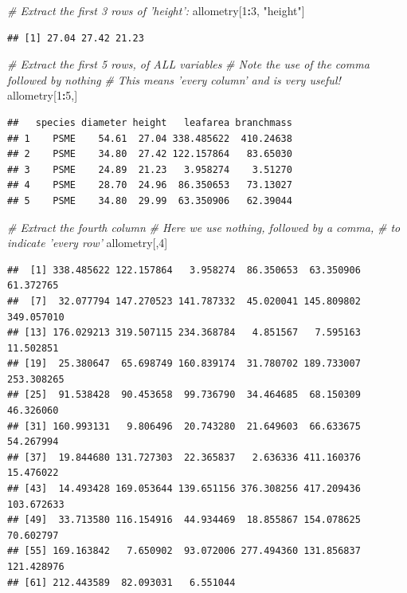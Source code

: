 \documentclass[]{book}
\newenvironment{Shaded}{\begin{snugshade}}{\end{snugshade}}
\newcommand{\CommentTok}[1]{\textcolor[rgb]{0.56,0.35,0.01}{\textit{#1}}}
\newcommand{\DecValTok}[1]{\textcolor[rgb]{0.00,0.00,0.81}{#1}}
\newcommand{\NormalTok}[1]{#1}
\newcommand{\OperatorTok}[1]{\textcolor[rgb]{0.81,0.36,0.00}{\textbf{#1}}}
\newcommand{\StringTok}[1]{\textcolor[rgb]{0.31,0.60,0.02}{#1}}
\begin{document}
\begin{Shaded}
\begin{Highlighting}[]
\CommentTok{# Extract the first 3 rows of 'height':}
\NormalTok{allometry[}\DecValTok{1}\OperatorTok{:}\DecValTok{3}\NormalTok{, }\StringTok{"height"}\NormalTok{]}
\end{Highlighting}
\end{Shaded}

\begin{verbatim}
## [1] 27.04 27.42 21.23
\end{verbatim}

\begin{Shaded}
\begin{Highlighting}[]
\CommentTok{# Extract the first 5 rows, of ALL variables}
\CommentTok{# Note the use of the comma followed by nothing}
\CommentTok{# This means 'every column' and is very useful!}
\NormalTok{allometry[}\DecValTok{1}\OperatorTok{:}\DecValTok{5}\NormalTok{,]}
\end{Highlighting}
\end{Shaded}

\begin{verbatim}
##   species diameter height   leafarea branchmass
## 1    PSME    54.61  27.04 338.485622  410.24638
## 2    PSME    34.80  27.42 122.157864   83.65030
## 3    PSME    24.89  21.23   3.958274    3.51270
## 4    PSME    28.70  24.96  86.350653   73.13027
## 5    PSME    34.80  29.99  63.350906   62.39044
\end{verbatim}

\begin{Shaded}
\begin{Highlighting}[]
\CommentTok{# Extract the fourth column}
\CommentTok{# Here we use nothing, followed by a comma,}
\CommentTok{# to indicate 'every row'}
\NormalTok{allometry[,}\DecValTok{4}\NormalTok{]}
\end{Highlighting}
\end{Shaded}

\begin{verbatim}
##  [1] 338.485622 122.157864   3.958274  86.350653  63.350906  61.372765
##  [7]  32.077794 147.270523 141.787332  45.020041 145.809802 349.057010
## [13] 176.029213 319.507115 234.368784   4.851567   7.595163  11.502851
## [19]  25.380647  65.698749 160.839174  31.780702 189.733007 253.308265
## [25]  91.538428  90.453658  99.736790  34.464685  68.150309  46.326060
## [31] 160.993131   9.806496  20.743280  21.649603  66.633675  54.267994
## [37]  19.844680 131.727303  22.365837   2.636336 411.160376  15.476022
## [43]  14.493428 169.053644 139.651156 376.308256 417.209436 103.672633
## [49]  33.713580 116.154916  44.934469  18.855867 154.078625  70.602797
## [55] 169.163842   7.650902  93.072006 277.494360 131.856837 121.428976
## [61] 212.443589  82.093031   6.551044
\end{verbatim}
\end{document}
